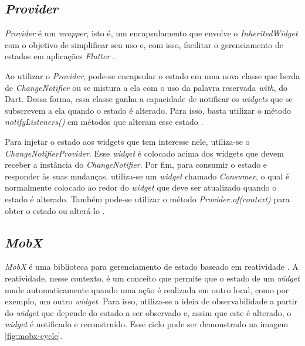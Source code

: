\subsection{\textit{Provider}}
\label{cap2:Subsec:Provider}

\textit{Provider} é um \textit{wrapper}, isto é, um encapsulamento que envolve o \textit{InheritedWidget} com o objetivo de simplificar seu uso e, com isso, facilitar o gerenciamento de estados em aplicações \textit{Flutter} \cite{provider-package}.

Ao utilizar o \textit{Provider}, pode-se encapsular o estado em uma nova classe que herda de \textit{ChangeNotifier} ou se mistura a ela com o uso da palavra reservada \textit{with}, do Dart. Dessa forma, essa classe ganha a capacidade de notificar os \textit{widgets} que se subscrevem a ela quando o estado é alterado. Para isso, basta utilizar o método \textit{notifyListeners()} em métodos que alteram esse estado \cite{flutter2022simple} \cite{flutter2019statemgmt}.

Para injetar o estado aos widgets que tem interesse nele, utiliza-se o \textit{ChangeNotifierProvider}. Esse \textit{widget} é colocado acima dos widgets que devem receber a instância do \textit{ChangeNotifier}. Por fim, para consumir o estado e responder às suas mudanças, utiliza-se um \textit{widget} chamado \textit{Consumer}, o qual é normalmente colocado ao redor do \textit{widget} que deve ser atualizado quando o estado é alterado. Também pode-se utilizar o método \textit{Provider.of(context)} para obter o estado ou alterá-lo \cite{flutter2022simple} \cite{flutter2019statemgmt}.

\subsection{\textit{MobX}}
\label{cap2:Subsec:MobX}
\textit{MobX} é uma biblioteca para gerenciamento de estado baseado em reatividade \cite{mobx-package}. A reatividade, nesse contexto, é um conceito que permite que o estado de um \textit{widget} mude automaticamente quando uma ação é realizada em outro local, como por exemplo, um outro \textit{widget}. Para isso, utiliza-se a ideia de observabilidade a partir do \textit{widget} que depende do estado a ser observado e, assim que este é alterado, o \textit{widget} é notificado e reconstruído. Esse ciclo pode ser demonstrado na imagem \ref{fig:mobx-cycle}.

